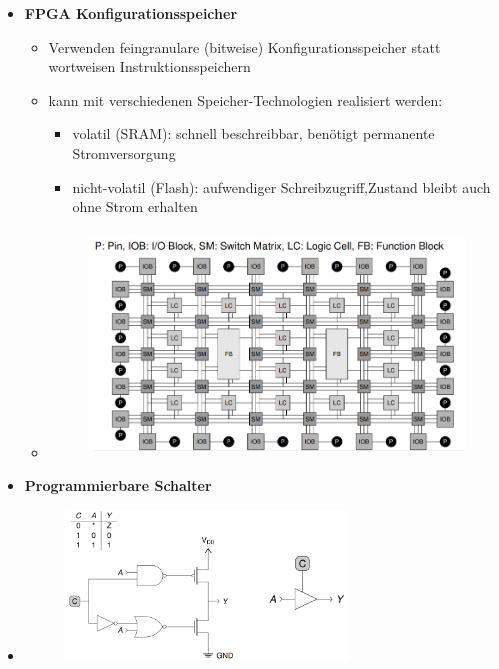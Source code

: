 \documentclass[11pt,a4paper]{article}
\begin{document}
\begin{itemize}
\item \textbf{FPGA Konfigurationsspeicher}
	\begin{itemize}
	\item Verwenden feingranulare (bitweise) Konfigurationsspeicher statt wortweisen Instruktionsspeichern
	\item kann mit verschiedenen Speicher-Technologien realisiert werden:
		\begin{itemize}
		\item volatil (SRAM): schnell beschreibbar, benötigt permanente Stromversorgung
		\item nicht-volatil (Flash): aufwendiger Schreibzugriff,Zustand bleibt auch ohne Strom erhalten
		\end{itemize}
	\item[]
			\begin{figure}[H]
			\begin{center}
			\includegraphics[height=6cm]{fpga}
			\end{center}
			\end{figure}
	\end{itemize}

\item \textbf{Programmierbare Schalter}
\item[]
			\begin{figure}[H]
			\begin{center}
			\includegraphics[height=4cm]{programmschalter}
			\end{center}
			\end{figure}


\end{itemize}
\end{document}

